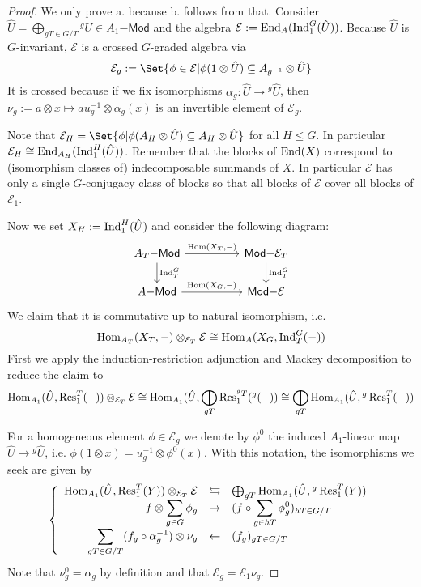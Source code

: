 \begin{proof}%
We only prove a. because b. follows from that. Consider $\hat{U}=\bigoplus_{gT\in G/T} {^g U} \in A_1\mathsf{-Mod}$ and the algebra $\mathcal{E}:=\operatorname{End}_A(\operatorname{Ind}_1^G(\hat{U}))$. Because $\hat{U}$ is $G$-invariant, $\mathcal{E}$ is a crossed $G$-graded algebra via
\[\mathcal{E}_g := \Set{\phi\in\mathcal{E} | \phi(1\otimes \hat{U}) \subseteq A_{g^{-1}}\otimes \hat{U}}\]
It is crossed because if we fix isomorphisms $\alpha_g: \hat{U} \to {^g\hat{U}}$, then $\nu_g := a\otimes x \mapsto au_g^{-1} \otimes\alpha_g(x)$ is an invertible element of $\mathcal{E}_g$.

Note that $\mathcal{E}_H = \Set{\phi | \phi(A_H\otimes\hat{U})\subseteq A_H\otimes\hat{U}}$ for all $H\leq G$. In particular $\mathcal{E}_H \cong \operatorname{End}_{A_H}(\operatorname{Ind}_1^H(\hat{U}))$. Remember that the blocks of $\operatorname{End}(X)$ correspond to (isomorphism classes of) indecomposable summands of $X$. In particular $\mathcal{E}$ has only a single $G$-conjugacy class of blocks so that all blocks of $\mathcal{E}$ cover all blocks of $\mathcal{E}_1$.

Now we set $X_H:=\operatorname{Ind}_1^H(\hat{U})$ and consider the following diagram:
\[\begin{tikzcd}
A_T\mathsf{-Mod} \arrow[rr,"{\Hom(X_T,-)}"] \arrow[d,"\Ind_T^G"] && \mathsf{Mod-}\mathcal{E}_T \arrow[d,"\Ind_T^G"] \\
A\mathsf{-Mod} \arrow[rr,"{\Hom(X_G,-)}"] && \mathsf{Mod-}\mathcal{E}
\end{tikzcd}\]
We claim that it is commutative up to natural isomorphism, i.e.
\[\operatorname{Hom}_{A_T}(X_T,-)\otimes_{\mathcal{E}_T}\mathcal{E} \cong \operatorname{Hom}_A(X_G,\operatorname{Ind}_T^G(-))\]
First we apply the induction-restriction adjunction and Mackey decomposition to reduce the claim to
\[\operatorname{Hom}_{A_1}(\hat{U},\operatorname{Res}_1^T(-))\otimes_{\mathcal{E}_T}\mathcal{E} \cong \operatorname{Hom}_{A_1}(\hat{U},\bigoplus_{gT} \operatorname{Res}_1^{^g T}({^g(-)}) \cong \bigoplus_{gT} \operatorname{Hom}_{A_1}(\hat{U},{^g \operatorname{Res}_1^T(-)})\]

For a homogeneous element $\phi\in\mathcal{E}_g$ we denote by $\phi^0$ the induced $A_1$-linear map $\hat{U}\to{^g \hat{U}}$, i.e. $\phi(1\otimes x) = u_g^{-1}\otimes\phi^0(x)$. With this notation, the isomorphisms we seek are given by
\[\left\{\begin{array}{rcl}
\operatorname{Hom}_{A_1}(\hat{U},\operatorname{Res}_1^T(Y))\otimes_{\mathcal{E}_T} \mathcal{E} &\leftrightarrows& \bigoplus_{gT} \operatorname{Hom}_{A_1}(\hat{U},{^g \operatorname{Res}_1^T(Y)}) \\
\displaystyle
f\otimes\sum_{g\in G} \phi_g &\mapsto& \displaystyle(f\circ\sum_{g\in hT} \phi_g^0)_{hT\in G/T} \\
\displaystyle
\sum_{gT\in G/T} (f_g\circ\alpha_g^{-1})\otimes\nu_g &\leftarrow& (f_g)_{gT\in G/T}
\end{array}\right.\]
Note that $\nu_g^0 = \alpha_g$ by definition and that $\mathcal{E}_g = \mathcal{E}_1\nu_g$.


\end{proof}
